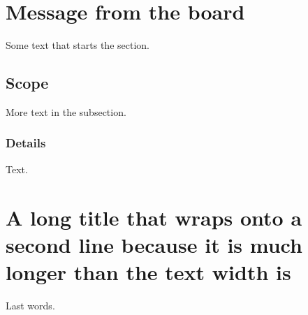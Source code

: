 \documentclass{article}
\begin{document}
\section{Message from the board}
Some text that starts the section.
\subsection{Scope}
More text in the subsection.
\subsubsection{Details}
Text.
\setcounter{section}{10}
\section{A long title that wraps onto a second line because it is much longer than the text width is}
Last words.
\end{document}
